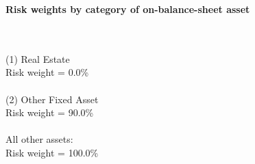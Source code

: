 \documentclass{article}
\begin{document}
\setlength{\parindent}{0em}
\begin{center}{\bf Risk weights by category of on-balance-sheet asset}\end{center}
~\\
~\\

(1) Real Estate\\
Risk weight = 0.0\%\\

~\\
(2) Other Fixed Asset\\
Risk weight = 90.0\%\\

~\\
All other assets:\\
Risk weight = 100.0\%\\

~\\
\end{document}
